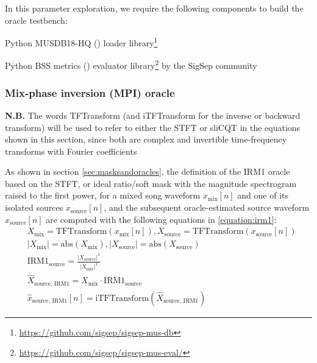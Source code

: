 \documentclass[report.tex]{subfiles}
\begin{document}
In this parameter exploration, we require the following components to build the oracle testbench:

\begin{tight_enumerate}
	\item
		Python MUSDB18-HQ (\cite{musdb18hq}) loader library\footnote{\url{https://github.com/sigsep/sigsep-mus-db}}
	\item
		Python BSS metrics (\cite{bss}) evaluator library\footnote{\url{https://github.com/sigsep/sigsep-mus-eval/}} by the SigSep community
\end{tight_enumerate}

\subsubsection{Mix-phase inversion (MPI) oracle}
\label{sec:mpi}

\textbf{N.B.} The words TFTransform (and iTFTransform for the inverse or backward transform) will be used to refer to either the STFT or sliCQT in the equations shown in this section, since both are complex and invertible time-frequency transforms with Fourier coefficients

As shown in section \ref{sec:masksandoracles}, the definition of the IRM1 oracle based on the STFT, or ideal ratio/soft mask with the magnitude spectrogram raised to the first power, for a mixed song waveform $x_{\text{mix}}[n]$ and one of its isolated sources $x_{\text{source}}[n]$, and the subsequent oracle-estimated source waveform $\hat{x}_{\text{source}}[n]$ are computed with the following equations in \ref{equation:irm1}:
\begin{align}\tag{1}\label{equation:irm1}
	\nonumber & X_{\text{mix}} = \text{TFTransform}(x_{\text{mix}}[n]), X_{\text{source}} = \text{TFTransform}(x_{\text{source}}[n])\\
	\nonumber & |X_{\text{mix}}| = \text{abs}(X_{\text{mix}}), |X_{\text{source}}| = \text{abs}(X_{\text{source}})\\
	\nonumber & \text{IRM1}_{\text{source}} = \frac{|X_{\text{source}}|^{1}}{|X_{\text{mix}}|^{1}}\\
	\nonumber & \hat{X}_{\text{source, IRM1}} = X_{\text{mix}} \cdot \text{IRM1}_{\text{source}}\\
	\nonumber & \hat{x}_{\text{source, IRM1}}[n] = \text{iTFTransform}(\hat{X}_{\text{source, IRM1}})
\end{align}
\end{document}
